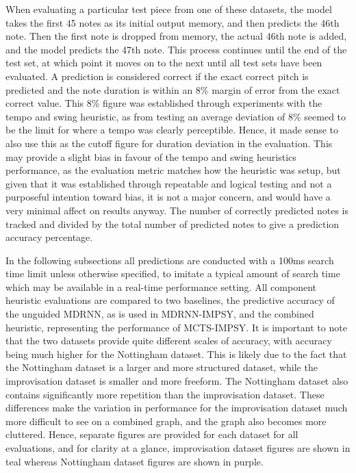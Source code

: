When evaluating a particular test piece from one of these datasets, the model takes the first 45 notes as its initial output memory, and then predicts the 46th note. Then the first note is dropped from memory, the actual 46th note is added, and the model predicts the 47th note. This process continues until the end of the test set, at which point it moves on to the next until all test sets have been evaluated. A prediction is considered correct if the exact correct pitch is predicted and the note duration is within an 8\% margin of error from the exact correct value. This 8\% figure was established through experiments with the tempo and swing heuristic, as from testing an average deviation of 8\% seemed to be the limit for where a tempo was clearly perceptible. Hence, it made sense to also use this as the cutoff figure for duration deviation in the evaluation. This may provide a slight bias in favour of the tempo and swing heuristics performance, as the evaluation metric matches how the heuristic was setup, but given that it was established through repeatable and logical testing and not a purposeful intention toward bias, it is not a major concern, and would have a very minimal affect on results anyway. The number of correctly predicted notes is tracked and divided by the total number of predicted notes to give a prediction accuracy percentage.

In the following subsections all predictions are conducted with a 100ms search time limit unless otherwise specified, to imitate a typical amount of search time which may be available in a real-time performance setting. All component heuristic evaluations are compared to two baselines, the predictive accuracy of the unguided MDRNN, as is used in MDRNN-IMPSY, and the combined heuristic, representing the performance of MCTS-IMPSY. It is important to note that the two datasets provide quite different scales of accuracy, with accuracy being much higher for the Nottingham dataset. This is likely due to the fact that the Nottingham dataset is a larger and more structured dataset, while the improvisation dataset is smaller and more freeform. The Nottingham dataset also contains significantly more repetition than the improvisation dataset. These differences make the variation in performance for the improvisation dataset much more difficult to see on a combined graph, and the graph also becomes more cluttered. Hence, separate figures are provided for each dataset for all evaluations, and for clarity at a glance, improvisation dataset figures are shown in teal whereas Nottingham dataset figures are shown in purple.

